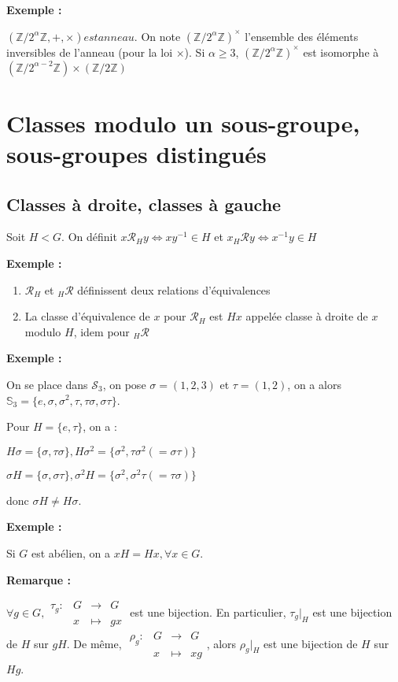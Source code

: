 \documentclass{report}
\newenvironment{exemple}{\begin{tcolorbox}[colframe= white]
    \textbf{Exemple :}
     \par}
    {\end{tcolorbox}}
\newcommand{\remarque}{
    \noindent\textbf{Remarque :} \par
}
\newcommand{\fonction}[5]{
    \begin{array}{l|rcl}
    #1: & #2 & \longrightarrow & #3 \\
        & #4 & \longmapsto & #5 
    \end{array}
}
\newcommand{\Z}{\mathbb{Z}}
\begin{document}
\begin{exemple}
$(\Z / 2^{\alpha}\Z,+,\times) est anneau$. On note $(\Z / 2^{\alpha}\Z)^{\times}$ l'ensemble des éléments inversibles de l'anneau (pour la loi $\times$). Si $\alpha \ge 3$, $(\Z / 2^{\alpha}\Z)^{\times}$ est isomorphe à $(\Z /2^{\alpha -2}\Z)\times(\Z / 2\Z)$
\end{exemple}

\chapter{Classes modulo un sous-groupe, sous-groupes distingués}


\section{Classes à droite, classes à gauche}

Soit $H < G$. On définit $x\mathcal{R}_H y \iff xy^{-1} \in H$ et $x _{H}\mathcal{R} y \iff x^{-1}y \in H$

\begin{exemple}
\begin{enumerate}
    \item $\mathcal{R}_H$ et $_{H}\mathcal{R}$ définissent deux relations d'équivalences
\item La classe d'équivalence de $x$ pour $\mathcal{R}_H$ est $Hx$ appelée classe à droite de $x$ modulo $H$, idem pour $_{H}\mathcal{R}$
\end{enumerate}
\end{exemple}

\begin{exemple}
	On se place dans $\mathcal{S}_3$, on pose $\sigma=(1,2,3)$ et $\tau=(1,2)$, on a alors $\mathbb{S}_3 = \{e,\sigma,\sigma^2,\tau,\tau\sigma,\sigma\tau\}$.\par Pour $H = \{e,\tau \}$, on a :\par
    $H\sigma = \{\sigma, \tau\sigma\}, H\sigma^2 = \{\sigma^2,\tau\sigma^2 (=\sigma\tau)\}$\par
    $\sigma H = \{\sigma,\sigma\tau\},\sigma^2 H = \{\sigma^2,\sigma^2 \tau (=\tau \sigma)\}$\par
    donc $\sigma H \neq H \sigma$.
\end{exemple}

\begin{exemple}
    Si $G$ est abélien, on a $xH = Hx,\forall x \in G$.
\end{exemple}

\remarque
$\forall g \in G, \fonction{\tau_g}{G}{G}{x}{gx}$ est une bijection. En particulier, $\tau_g|_H$ est une bijection de $H$ sur $gH$. De même, $\fonction{\rho_g}{G}{G}{x}{xg}$, alors $\rho_g|_H$ est une bijection de $H$ sur $Hg$.
\end{document}
